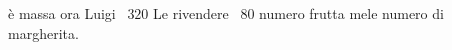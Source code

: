 \begin{htmulticols}{2}
è 
massa 
% 
ora 
Luigi 
% 
\officialeuro~\(320\) Le 
rivendere 
\officialeuro~\(80\) 
% 
numero 
% 
frutta 
mele 
numero di 
% 
% 
margherita. 

\end{htmulticols}
